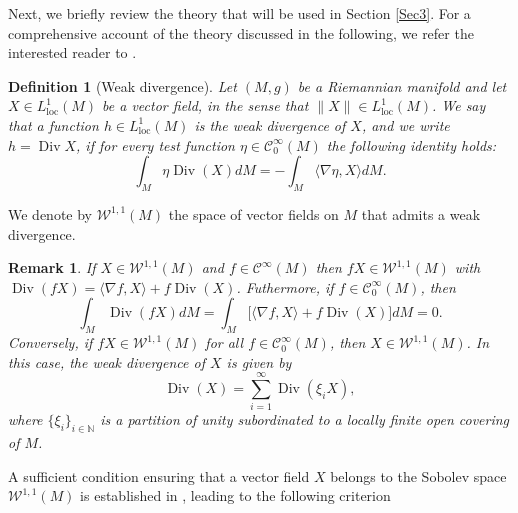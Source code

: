 \documentclass{article}
\newtheorem{remark}[thm]{Remark}
\newtheorem{definition}[thm]{Definition}
\begin{document}
Next, we briefly review the theory that will be used in Section \ref{Sec3}. For a comprehensive account of the theory discussed in the following, we refer the interested reader to \cite{BessaMontenegro, LimaMontenegroSantos2010, lindqvist, SchoenYau1994}.

\begin{definition}[Weak divergence]
\label{def:weakdiv}
Let $(M,g)$ be a Riemannian manifold and let $X \in L_{\mathrm{loc}}^{1}(M)$ be a vector field, in the sense that $\|X\| \in L_{\mathrm{loc}}^{1}(M)$. 
We say that a function $h \in L_{\mathrm{loc}}^{1}(M)$ is the weak divergence of $X$, and we write $h = \operatorname{Div} X$, if for every test function $\eta \in \mathcal{C}_0^{\infty}(M)$ the following identity holds:
\[ \int_{M} \eta \operatorname{Div}(X) dM = -\int_{M} \langle \nabla \eta, X \rangle dM. \]
\end{definition}
We denote by $\mathcal{W}^{1,1}(M)$ the space of vector fields on $M$
that admits a weak divergence. 
\begin{remark}\label{caracteeizationDiv}
If $X \in \mathcal{W}^{1,1}(M)$ and $f \in \mathcal{C}^{\infty}(M)$ then $fX \in \mathcal{W}^{1,1}(M)$ with $\operatorname{Div}(fX)= \langle \nabla f , X \rangle +f\operatorname{Div}(X)$. Futhermore, if $f \in \mathcal{C}_0^{\infty}(M)$, then
\begin{equation}
    \int_M \operatorname{Div}(fX) dM =\int_M \Big[ \langle \nabla f , X \rangle +f\operatorname{Div}(X)\Big] dM = 0.
\end{equation}
Conversely, if $fX \in \mathcal{W}^{1,1}(M)$ for all $f \in \mathcal{C}_0^{\infty}(M)$,
then $X \in \mathcal{W}^{1,1}(M)$. In this case, the weak divergence of $X$ is
given by
\begin{equation*}
\operatorname{Div}(X) = \sum_{i=1}^{\infty} \operatorname{Div}\!\left(\xi_i X\right),  
\end{equation*} where $\{\xi_i\}_{i\in\mathbb{N}}$ is a partition of unity subordinated to a locally finite open covering of $M$. 
\end{remark}
A sufficient condition ensuring that a vector field $X$ belongs to the Sobolev space $\mathcal{W}^{1,1}(M)$ is established in \cite[Lemma 3.5]{BessaMontenegro}, leading to the following criterion
\end{document}

